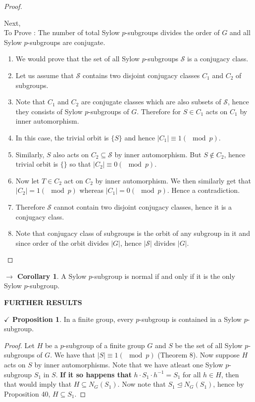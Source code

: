 \documentclass{article}
\theoremstyle{definition}
\theoremstyle{remark}
\theoremstyle{definition}
\newtheorem{corollary}{$ \to $ Corollary}
\theoremstyle{definition}
\newtheorem{proposition}{$\checkmark$ Proposition}
\theoremstyle{definition}
\theoremstyle{proof}
\newcommand{\inv}[1]{#1^{-1}}
\newcommand{\order}[1]{\left\vert #1 \right\vert}
\newcommand{\nsg}[0]{\trianglelefteq}
\begin{document}
\begin{proof}
\begin{enumerate}
\end{enumerate}
Next,\\
To Prove : The number of total Sylow $ p $-subgroups divides the order of $ G $ and all Sylow $ p $-subgroups are conjugate.
\begin{enumerate}
	\itemsep-0.3em
	\item{We would prove that the set of all Sylow $ p $-subgroups $ \mathcal{S} $ is a conjugacy class.}
	\item{Let us assume that $ \mathcal{S} $ contains two disjoint conjugacy classes $ C_1 $ and $ C_2 $ of subgroups.}
	\item{Note that $ C_1 $ and $ C_2 $ are conjugate classes which are also subsets of $ \mathcal{S} $, hence they consists of Sylow $ p $-subgroups of $ G $. Therefore for $S \in C_1 $ acts on $ C_1 $ by inner automorphism.}
	\item{In this case, the trivial orbit is $ \{S\} $ and hence $ \order{C_1} \equiv 1(\mod p) $.}
	\item{Similarly, $ S $ also acts on $ C_2 \subseteq \mathcal{S}$ by inner automorphism. But $ S\notin C_2 $, hence trivial orbit is $ \{\} $ so that $ \order{C_2} \equiv 0(\mod p) $.}
	\item{Now let $ T\in C_2 $ act on $ C_2 $ by inner automorphism. We then similarly get that $ \order{C_2} = 1(\mod p) $ whereas $ \order{C_1} = 0(\mod p) $. Hence a contradiction.}
	\item{Therefore $ \mathcal{S} $ cannot contain two disjoint conjugacy classes, hence it is a conjugacy class.}
	\item{Note that conjugacy class of subgroups is the orbit of any subgroup in it and since order of the orbit divides $ \order{G} $, hence $ \order{\mathcal{S}} $ divides $ \order{G} $.}
\end{enumerate}
\end{proof}
\newpage
\begin{corollary}
	A Sylow $ p $-subgroup is normal if and only if it is the only Sylow $ p $-subgroup.
\end{corollary}
\hrulefill
\textbf{FURTHER RESULTS}
\hrulefill
\begin{proposition}
	In a finite group, every $ p $-subgroup is contained in a Sylow $ p$-subgroup.
\end{proposition}
\begin{proof}
	Let $ H $ be a $ p $-subgroup of a finite group $ G $ and $ S $ be the set of all Sylow $ p $-subgroups of $ G $. We have that $ \order{S} \equiv 1 (\mod p) $ (Theorem 8). Now suppose $ H $ acts on $ S $ by inner automorphisms. Note that we have atleast one Sylow $ p $-subgroup $ S_1 $ in $ S $. \textbf{If it so happens that} $ h\cdot S_1\cdot \inv{h} = S_1 $ for all $ h\in H $, then that would imply that $ H\subseteq N_G(S_1) $. Now note that $ S_1\nsg N_G(S_1) $, hence by Proposition 40, $ H\subseteq S_1 $.
\end{proof}
\end{document}
